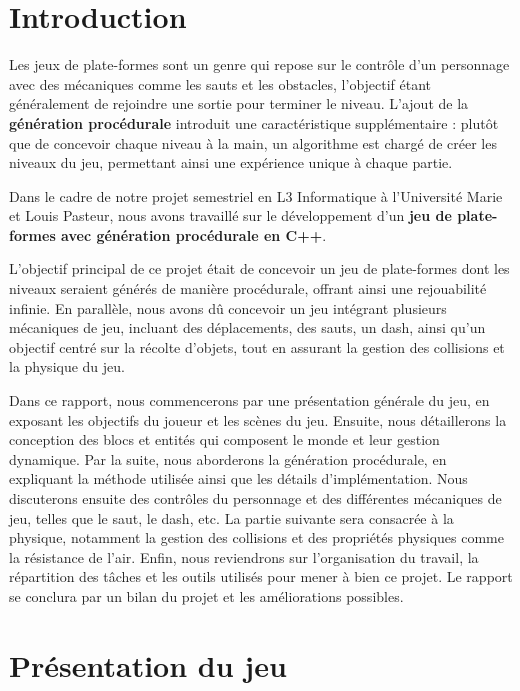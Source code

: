 \documentclass[10pt]{report}
\begin{document}
\normalsize
{}
\pagebreak
\listoffigures
\pagebreak

\section{Introduction}

Les jeux de plate-formes sont un genre qui repose sur le contrôle d'un personnage avec des mécaniques comme
les sauts et les obstacles, l’objectif étant généralement de rejoindre une sortie pour terminer le niveau.
L’ajout de la \textbf{génération procédurale} introduit une caractéristique supplémentaire :
plutôt que de concevoir chaque niveau à la main, un algorithme est chargé de créer les niveaux du jeu,
permettant ainsi une expérience unique à chaque partie.

Dans le cadre de notre projet semestriel en L3 Informatique à l'Université Marie et Louis Pasteur,
nous avons travaillé sur le développement d’un \textbf{jeu de plate-formes avec génération procédurale en C++}.

L'objectif principal de ce projet était de concevoir un jeu de plate-formes dont les niveaux seraient générés
de manière procédurale, offrant ainsi une rejouabilité infinie.
En parallèle, nous avons dû concevoir un jeu intégrant plusieurs mécaniques de jeu, incluant des déplacements,
des sauts, un dash, ainsi qu’un objectif centré sur la récolte d’objets, tout en assurant la gestion des collisions et la physique du jeu.

Dans ce rapport, nous commencerons par une présentation générale du jeu, en exposant les objectifs du joueur et
les scènes du jeu.
Ensuite, nous détaillerons la conception des blocs et entités qui composent le monde et leur gestion dynamique.
Par la suite, nous aborderons la génération procédurale, en expliquant la méthode utilisée ainsi que les détails
d'implémentation.
Nous discuterons ensuite des contrôles du personnage et des différentes mécaniques de jeu, telles que le saut,
le dash, etc.
La partie suivante sera consacrée à la physique, notamment la gestion des collisions et des propriétés physiques
comme la résistance de l'air.
Enfin, nous reviendrons sur l’organisation du travail, la répartition des tâches et les outils utilisés pour
mener à bien ce projet.
Le rapport se conclura par un bilan du projet et les améliorations possibles.

\pagebreak



\section{Présentation du jeu}
\end{document}
